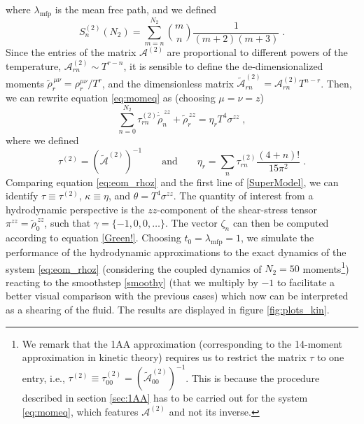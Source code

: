 \documentclass[a4paper, amsfonts, amssymb, amsmath, reprint, showkeys, nofootinbib, twoside, onecolumn,notitlepage]{revtex4-2}
\begin{document}
where $\lambda_{\text{mfp}}$ is the mean free path, and we defined
\begin{equation}
    S_n^{(2)}(N_2)=\sum_{m=n}^{N_2} \binom{m}{n} \frac{1}{(m+2)(m+3)}\;.
\end{equation}
Since the entries of the matrix $\mathcal{A}^{(2)}$ are proportional to different powers of the temperature, $\mathcal{A}^{(2)}_{rn}\sim T^{r-n}$, it is sensible to define the de-dimensionalized moments $\widetilde{\rho}_r^{\,\mu\nu}=\rho_r^{\mu\nu}/T^r$, and the dimensionless matrix $\widetilde{\mathcal{A}}^{(2)}_{rn}=\mathcal{A}^{(2)}_{rn} T^{n-r}$. Then, we can rewrite equation \eqref{eq:momeq} as (choosing $\mu=\nu=z$)
\begin{equation}
    \sum_{n=0}^{N_2}\tau^{(2)}_{rn} \dot{\widetilde{\rho}}^{\,zz}_n +\widetilde{\rho}_r^{\,zz}= \eta_r T^4 \sigma^{zz}\;,\label{eq:eom_rhoz}
\end{equation}
where we defined 
\begin{equation}
    \tau^{(2)}=\left(\widetilde{\mathcal{A}}^{(2)}\right)^{-1} \qquad \mathrm{and}\qquad \eta_r= \sum_{n} \tau_{rn}^{(2)} \frac{(4+n)!}{15\pi^2}\;.
\end{equation}
Comparing equation \eqref{eq:eom_rhoz} and the first line of \eqref{SuperModel}, we can identify $\tau \equiv \tau^{(2)}$, $\kappa\equiv \eta$, and $\theta=T^4 \sigma^{zz}$. The quantity of interest from a hydrodynamic perspective is the $zz$-component of the shear-stress tensor $\pi^{zz}=\widetilde{\rho}_0^{\,zz}$, such that $\gamma=\{-1,0,0,\ldots\}$. The vector $\zeta_n$ can then be computed according to equation \eqref{Green!}.
Choosing $t_0=\lambda_{\text{mfp}}=1$, we simulate the performance of the hydrodynamic approximations to the exact dynamics of the system \eqref{eq:eom_rhoz} (considering the coupled dynamics of $N_2=50$ moments\footnote{We remark that the 1AA approximation (corresponding to the 14-moment approximation in kinetic theory) requires us to restrict the matrix $\tau$ to one entry, i.e., $\tau^{(2)}\equiv\tau^{(2)}_{00}=(\widetilde{\mathcal{A}}^{(2)}_{00})^{-1}$. This is because the procedure described in section \ref{sec:1AA} has to be carried out for the system \eqref{eq:momeq}, which features $\mathcal{A}^{(2)}$ and not its inverse.}) reacting to the smoothstep \eqref{smoothy} (that we multiply by $-1$ to facilitate a better visual comparison with the previous cases) which now can be interpreted as a shearing of the fluid. The results are displayed in figure \ref{fig:plots_kin}. 
\end{document}
